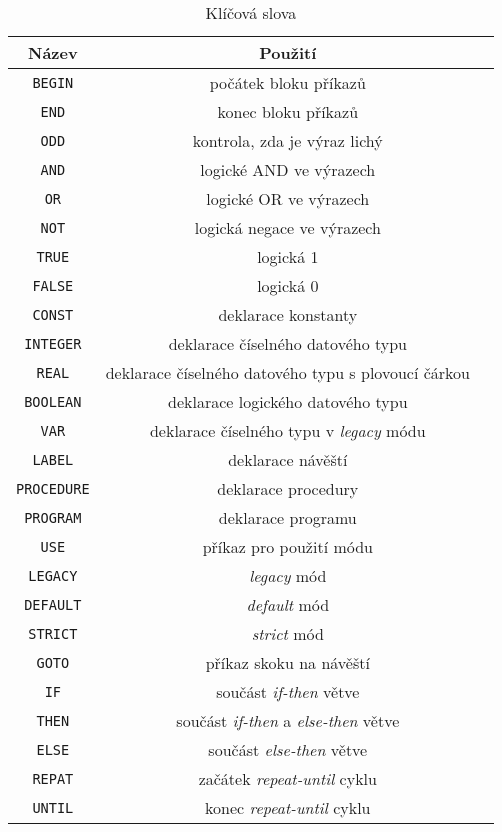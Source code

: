 \documentclass[
12pt,
a4paper,
pdftex,
czech
]{report}
\begin{document}
\begin{longtable}{|c|c|p{10cm}|}
\caption{Klíčová slova}
\label{slova}
\endfirsthead
\endhead
\hline
		\textbf{Název} &\textbf{Použití} \\
\hline
\texttt{BEGIN} & počátek bloku příkazů \\ \hline
\texttt{END} & konec bloku příkazů \\ \hline
\texttt{ODD} & kontrola, zda je výraz lichý \\ \hline
\texttt{AND} & logické AND ve výrazech \\ \hline
\texttt{OR} & logické OR ve výrazech \\ \hline
\texttt{NOT} & logická negace ve výrazech \\ \hline
\texttt{TRUE} & logická 1 \\ \hline
\texttt{FALSE} & logická 0 \\ \hline
\texttt{CONST} & deklarace konstanty \\ \hline
\texttt{INTEGER} & deklarace číselného datového typu \\ \hline
\texttt{REAL} & deklarace číselného datového typu s plovoucí čárkou \\ \hline
\texttt{BOOLEAN} & deklarace logického datového typu \\ \hline
\texttt{VAR} & deklarace číselného typu v \textit{legacy} módu \\ \hline
\texttt{LABEL} & deklarace návěští \\ \hline
\texttt{PROCEDURE} & deklarace procedury \\ \hline
\texttt{PROGRAM} & deklarace programu \\ \hline
\texttt{USE} & příkaz pro použití módu \\ \hline
\texttt{LEGACY} & \textit{legacy} mód \\ \hline
\texttt{DEFAULT} & \textit{default} mód \\ \hline
\texttt{STRICT} & \textit{strict} mód \\ \hline
\texttt{GOTO} & příkaz skoku na návěští \\ \hline
\texttt{IF} & součást \textit{if-then} větve \\ \hline
\texttt{THEN} & součást \textit{if-then} a \textit{else-then} větve \\ \hline
\texttt{ELSE} & součást \textit{else-then} větve \\ \hline
\texttt{REPAT} & začátek \textit{repeat-until} cyklu \\ \hline
\texttt{UNTIL} & konec \textit{repeat-until} cyklu \\ \hline

\end{longtable}
\end{document}
